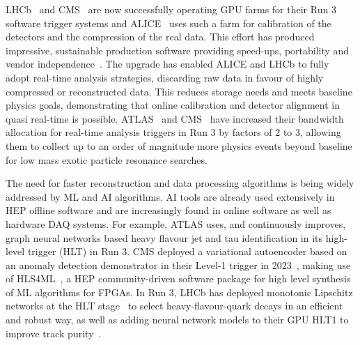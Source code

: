 \documentclass[10pt,a4paper]{article}
\begin{document}
LHCb~\cite{LHCb:RTDP} and CMS~\cite{CMS:Detector_R3}
are now successfully operating GPU farms for their
Run 3 software trigger systems and ALICE~\cite{ALICE:LS2_upgrades} uses such a farm for
calibration of the detectors and the compression of the real data. This
effort has produced impressive, sustainable production software providing
speed-ups, portability and vendor
independence~\cite{Concas:2024cyu, Aaij2020Allen,MathesP3MA2017}. The
upgrade has enabled ALICE and LHCb to fully adopt real-time analysis strategies,
discarding raw data in favour of highly compressed or reconstructed
data. This reduces storage needs and meets baseline physics goals, demonstrating that
online calibration and detector alignment in quasi real-time is possible.
ATLAS~\cite{ATLAS:trigger_LS3} and CMS~\cite{CMS:enriching_phys_programs}
have increased their bandwidth allocation for real-time
analysis triggers in Run 3 by factors of 2 to 3, allowing them to
collect up to an order of magnitude more physics events beyond
baseline for low mass exotic particle resonance searches.

The need for faster reconstruction and data processing algorithms is being
widely addressed by ML and AI algorithms. AI tools are already used extensively
in HEP offline software and are increasingly found in online software as well as
hardware DAQ systems. For example, ATLAS uses, and continuously improves, graph
neural networks based heavy flavour jet and tau identification in its high-level
trigger (HLT)\cite{ATLAS:perf_commissioning} in Run 3.
CMS deployed a variational autoencoder based on
an anomaly detection demonstrator in their Level-1 trigger in 2023~\cite{CMS-DP-2023-079},
making use of HLS4ML~\cite{fastml_team_hls4ml}, a HEP community-driven
software package for high level synthesis of ML algorithms for FPGAs. In Run 3,
LHCb has deployed monotonic Lipschitz networks at the HLT
stage~\cite{LHCb:Lipschitz} to select heavy-flavour-quark decays in an efficient
and robust way, as well as adding neural network models to their GPU HLT1 to
improve track purity~\cite{neuralmodelHLT1LHCb}.
\end{document}
